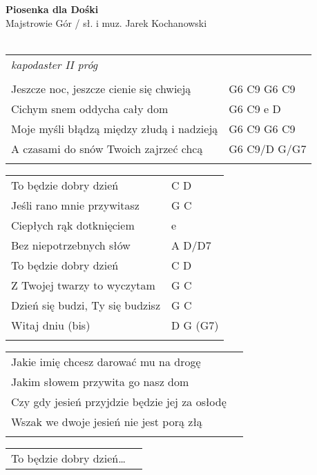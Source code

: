 \documentclass[a5paper]{article}
\begin{document}


\noindent
\fontsize{12pt}{15pt}\selectfont
\textbf{Piosenka dla Dośki} \\
\fontsize{8pt}{10pt}\selectfont
Majstrowie Gór / sł. i muz. Jarek Kochanowski \\ \\
\fontsize{10pt}{12pt}\selectfont
{}
\begin{tabular}{@{}p{7.50cm}p{3cm}@{}}
\noindent
\emph{kapodaster II próg} \\ \\

Jeszcze noc, jeszcze cienie się chwieją & G6 C9 G6 C9 \\
Cichym snem oddycha cały dom & G6 C9 e D \\
Moje myśli błądzą między złudą i nadzieją & G6 C9 G6 C9 \\
A czasami do snów Twoich zajrzeć chcą & G6 C9/D G/G7 \\ \\
\end{tabular}

\noindent
\begin{tabular}{@{}p{6.50cm}p{3cm}@{}}
To będzie dobry dzień & C D \\
Jeśli rano mnie przywitasz & G C \\
Ciepłych rąk dotknięciem & e \\
Bez niepotrzebnych słów & A D/D7 \\
To będzie dobry dzień & C D  \\
Z Twojej twarzy to wyczytam & G C \\
Dzień się budzi, Ty się budzisz & G C \\
Witaj dniu (bis) & D G (G7) \\ \\
\end{tabular}
  
\noindent
\begin{tabular}{@{}p{7.50cm}p{3cm}@{}}
Jakie imię chcesz darować mu na drogę \\
Jakim słowem przywita go nasz dom \\
Czy gdy jesień przyjdzie będzie jej za osłodę \\
Wszak we dwoje jesień nie jest porą złą \\ \\
\end{tabular}

\noindent
\begin{tabular}{@{}p{7.50cm}p{3cm}@{}}
To będzie dobry dzień…
\end{tabular}
\end{document}
